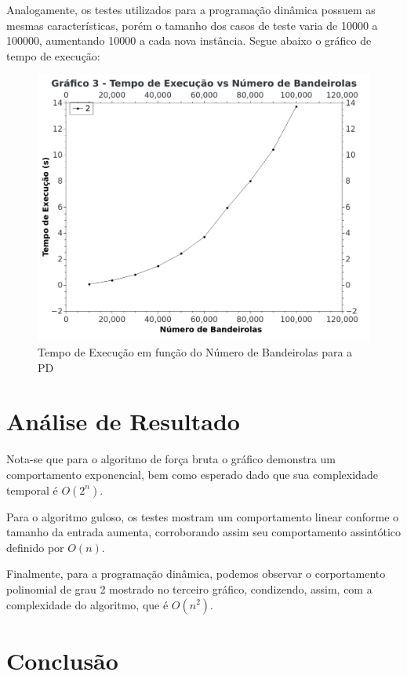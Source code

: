 \documentclass[
	12pt,
	a4paper,
	onepage,
	brazil
]{article}
\begin{document}
	Analogamente, os testes utilizados para a programação dinâmica possuem as mesmas características, porém o tamanho dos casos de teste varia de 10000 a 100000, aumentando 10000 a cada nova instância. Segue abaixo o gráfico de tempo de execução:
	
	\begin{figure}[H]
		\centering
		\includegraphics[scale=2]{dp_graph.png}
		\caption{Tempo de Execução em função do Número de Bandeirolas para a PD}
	\end{figure}
	
	\section{Análise de Resultado}
	
	Nota-se que para o algoritmo de força bruta o gráfico demonstra um comportamento exponencial, bem como esperado dado que sua complexidade temporal é $O(2^n)$.
	
	Para o algoritmo guloso, os testes mostram um comportamento linear conforme o tamanho da entrada aumenta, corroborando assim seu comportamento assintótico definido por $O(n)$.
	
	Finalmente, para a programação dinâmica, podemos observar o corportamento polinomial de grau 2 mostrado no terceiro gráfico, condizendo, assim, com a complexidade do algoritmo, que é $O(n^2)$.
	
	\section{Conclusão}
	
\end{document}
